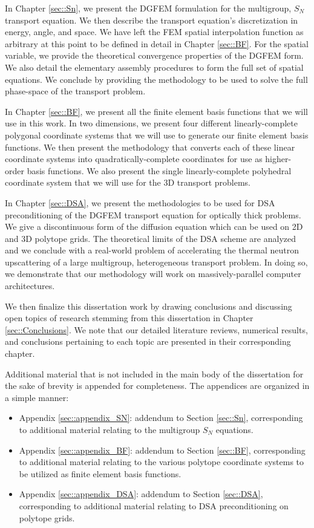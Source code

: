 In Chapter \ref{sec::Sn}, we present the DGFEM formulation for the multigroup, $S_N$ transport equation. We then describe the transport equation's discretization in energy, angle, and space. We have left the FEM spatial interpolation function as arbitrary at this point to be defined in detail in Chapter \ref{sec::BF}. For the spatial variable, we provide the theoretical convergence properties of the DGFEM form. We also detail the elementary assembly procedures to form the full set of spatial equations. We conclude by providing the methodology to be used to solve the full phase-space of the transport problem.

In Chapter \ref{sec::BF}, we present all the finite element basis functions that we will use in this work. In two dimensions, we present four different linearly-complete polygonal coordinate systems that we will use to generate our finite element basis functions. We then present the methodology that converts each of these linear coordinate systems into quadratically-complete coordinates for use as higher-order basis functions. We also present the single linearly-complete polyhedral coordinate system that we will use for the 3D transport problems.

In Chapter \ref{sec::DSA}, we present the methodologies to be used for DSA preconditioning of the DGFEM transport equation for optically thick problems. We give a discontinuous form of the diffusion equation which can be used on 2D and 3D polytope grids. The theoretical limits of the DSA scheme are analyzed and we conclude with a real-world problem of accelerating the thermal neutron upscattering of a large multigroup, heterogeneous transport problem. In doing so, we demonstrate that our methodology will work on massively-parallel computer architectures.

We then finalize this dissertation work by drawing conclusions and discussing open topics of research stemming from this dissertation in Chapter \ref{sec::Conclusions}. We note that our detailed literature reviews, numerical results, and conclusions pertaining to each topic are presented in their corresponding chapter.

Additional material that is not included in the main body of the dissertation for the sake of brevity is appended for completeness. The appendices are organized in a simple manner:

\begin{itemize}
\item Appendix \ref{sec::appendix_SN}: addendum to Section \ref{sec::Sn}, corresponding to additional material relating to the multigroup $S_N$ equations.
\item Appendix \ref{sec::appendix_BF}: addendum to Section \ref{sec::BF}, corresponding to additional material relating to the various polytope coordinate systems to be utilized as finite element basis functions.
\item Appendix \ref{sec::appendix_DSA}: addendum to Section \ref{sec::DSA}, corresponding to additional material relating to DSA preconditioning on polytope grids.
\end{itemize}